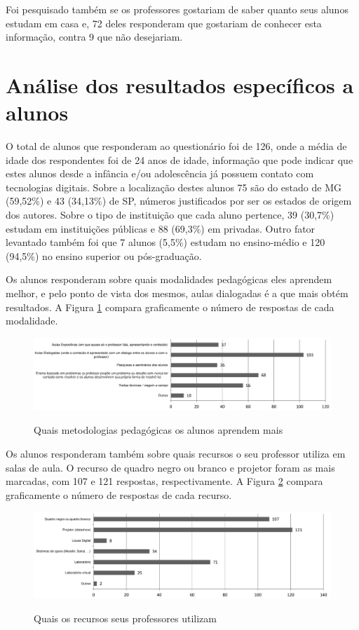 Foi pesquisado também se os professores gostariam de saber quanto seus alunos estudam em casa e, 72 deles responderam que gostariam de conhecer esta informação, contra 9 que não desejariam.

\section{Análise dos resultados específicos a alunos}

O total de alunos que responderam ao questionário foi de 126, onde a média de idade dos respondentes foi de 24 anos de idade, informação que pode indicar que estes alunos desde a infância e/ou adolescência já possuem contato com tecnologias digitais. Sobre a localização destes alunos 75 são do estado de MG (59,52\%) e 43 (34,13\%) de SP, números justificados por ser os estados de origem dos autores. Sobre o tipo de instituição que cada aluno pertence, 39 (30,7\%) estudam em instituições públicas e 88 (69,3\%) em privadas. Outro fator levantado também foi que 7 alunos (5,5\%) estudam no ensino-médio e 120 (94,5\%) no ensino superior ou pós-graduação.

Os alunos responderam sobre quais modalidades pedagógicas eles aprendem melhor, e pelo ponto de vista dos mesmos, aulas dialogadas é a que mais obtém resultados. A Figura \ref{fig:metodologia_alunos} compara graficamente o número de respostas de cada modalidade.

\begin{figure}
\centering
\caption{Quais metodologias pedagógicas os alunos aprendem mais}
\includegraphics[width=1.0\textwidth]{pdfs/alunos-professores/pesquisa-alunos-modalidade-pedagogicas.pdf} 
\label{fig:metodologia_alunos} 
\end{figure}

Os alunos responderam também sobre quais recursos o seu professor utiliza em salas de aula. O recurso de quadro negro ou branco e projetor foram as mais marcadas, com 107 e 121 respostas, respectivamente. A Figura \ref{fig:recursos_professores} compara graficamente o número de respostas de cada recurso.

\begin{figure}
\centering
\caption{Quais os recursos seus professores utilizam}
\includegraphics[width=1.0\textwidth]{pdfs/alunos-professores/pesquisa-alunos-recursos-que-seu-professor.pdf} 
\label{fig:recursos_professores} 
\end{figure}


